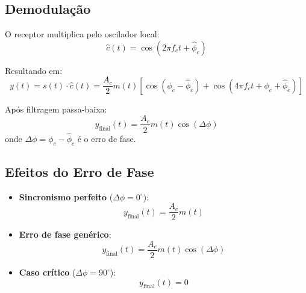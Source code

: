 \subsection{Demodulação}
O receptor multiplica pelo oscilador local:
\begin{equation}
    \hat{c}(t) = \cos(2\pi f_c t + \hat{\phi}_c)
\end{equation}

Resultando em:
\begin{equation}
    y(t) = s(t) \cdot \hat{c}(t) = \frac{A_c}{2} m(t) \left[ \cos(\phi_c - \hat{\phi}_c) + \cos(4\pi f_c t + \phi_c + \hat{\phi}_c) \right]
\end{equation}

Após filtragem passa-baixa:
\begin{equation}
    y_{\text{final}}(t) = \frac{A_c}{2} m(t) \cos(\Delta \phi)
\end{equation}
onde $\Delta \phi = \phi_c - \hat{\phi}_c$ é o erro de fase.

\subsection{Efeitos do Erro de Fase}
\begin{itemize}
    \item \textbf{Sincronismo perfeito} ($\Delta \phi = 0^\circ$):
    \begin{equation}
        y_{\text{final}}(t) = \frac{A_c}{2} m(t)
    \end{equation}
    
    \item \textbf{Erro de fase genérico}:
    \begin{equation}
        y_{\text{final}}(t) = \frac{A_c}{2} m(t) \cos(\Delta \phi)
    \end{equation}
    
    \item \textbf{Caso crítico} ($\Delta \phi = 90^\circ$):
    \begin{equation}
        y_{\text{final}}(t) = 0
    \end{equation}
\end{itemize}
